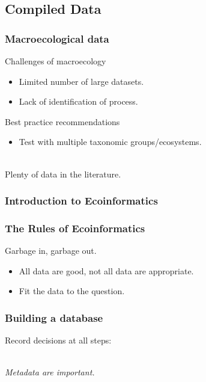 \documentclass[14pt]{beamer}
\begin{document}
\subsection{Compiled Data}
\begin{frame}[t]
\frametitle{Macroecological data}
Challenges of macroecology\\
\begin{small}
\begin{itemize}
\item Limited number of large datasets.
\item Lack of identification of process.
\end{itemize}
\end{small}
Best practice recommendations
\begin{small}
\begin{itemize}
\item Test with multiple taxonomic groups/ecosystems. 
\end{itemize}
\end{small} 
\begin{large}
~\\
Plenty of data in the literature.
\end{large}
\end{frame}


\subsubsection{Introduction to Ecoinformatics}
\begin{frame}[t]
\frametitle{The Rules of Ecoinformatics}
\begin{Large}
Garbage in, garbage out.\\
\end{Large}
\begin{itemize}
\item All data are good, not all data are appropriate.
\item Fit the data to the question.
\end{itemize}
\end{frame}

\begin{frame}[t]{}
\frametitle{Building a database}
\begin{center}
Record decisions at all steps:\\
~\\
\begin{large}
\emph{Metadata are important.}
\end{large}
\end{center}
\end{frame}
\end{document}
